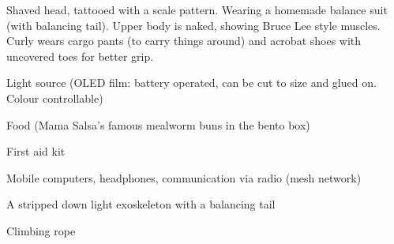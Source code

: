 \begin{npcBox}[title=Curly]
    \begin{consequences}
    \item {}
    \item {}
    \item {}
    \end{consequences}

    \begin{npcDescription}
    Shaved head, tattooed with a scale pattern. Wearing a homemade balance suit (with balancing tail).
    Upper body is naked, showing Bruce Lee style muscles. Curly wears cargo pants (to carry things around) and acrobat shoes with uncovered toes for better grip.
    \end{npcDescription}


    \begin{equipment}
    \item Light source (OLED film: battery operated, can be cut to size and glued on. Colour controllable)
    \item Food (Mama Salsa's famous mealworm buns in the bento box)
    \item First aid kit
    \item Mobile computers, headphones, communication via radio (mesh network)
    \item A stripped down light exoskeleton with a balancing tail
    \item Climbing rope
    \end{equipment}
\end{npcBox}



